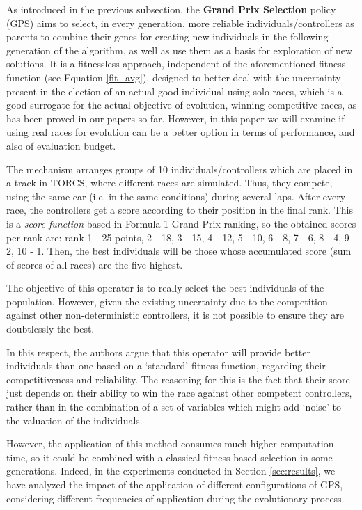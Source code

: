 \documentclass[10pt,journal,compsoc]{IEEEtran}
\begin{document}
As introduced in the previous subsection, the \textbf{Grand Prix Selection} policy
(GPS)  aims to select, in every generation, more reliable individuals/controllers as 
parents to combine their genes for creating new individuals in the
following generation of the algorithm, as well as use them as a basis
for exploration of new solutions. It is a fitnessless approach,
independent of the aforementioned fitness function (see Equation
\ref{fit_avg}), designed to better deal with the uncertainty present
in the election of an actual good individual using solo races, which
is a good surrogate for the actual objective of evolution, winning
competitive races, as has been proved in our papers so far. However,
in this paper we will examine if using real races for evolution can be
a better option in terms of performance, and also of evaluation
budget. 

The mechanism arranges groups of 10 individuals/controllers which are placed in a track in TORCS, where different races are simulated. Thus, they compete, using the same car (i.e. in the same conditions) during several laps. After every race, the controllers get a score according to their position in the final rank. This is a \textit{score function} based in Formula 1 Grand Prix ranking, so the obtained scores per rank are: rank 1 - 25 points, 2 - 18, 3 - 15, 4 - 12, 5 - 10, 6 - 8, 7 - 6, 8 - 4, 9 - 2, 10 - 1.
Then, the best individuals will be those whose accumulated score (sum of scores of all races) are the five highest.

The objective of this operator is to really select the best
individuals of the population. However, given the existing uncertainty
\cite{merelo2016statistical} due to the competition against other
non-deterministic controllers, it is not possible to ensure they are
doubtlessly the best. 

In this respect, the authors argue that this operator will provide better individuals than one based on a `standard' fitness function, regarding their competitiveness and reliability. The reasoning for this is the fact that their score just depends on their ability to win the race against other competent controllers, rather than in the combination of a set of variables which might add `noise' to the valuation of the individuals.

However, the application of this method consumes much higher computation time, so it could be combined with a classical fitness-based selection in some generations. Indeed, in the experiments conducted in Section \ref{sec:results}, we have analyzed the impact of the application of different configurations of GPS, considering different frequencies of application during the evolutionary process.
\end{document}
